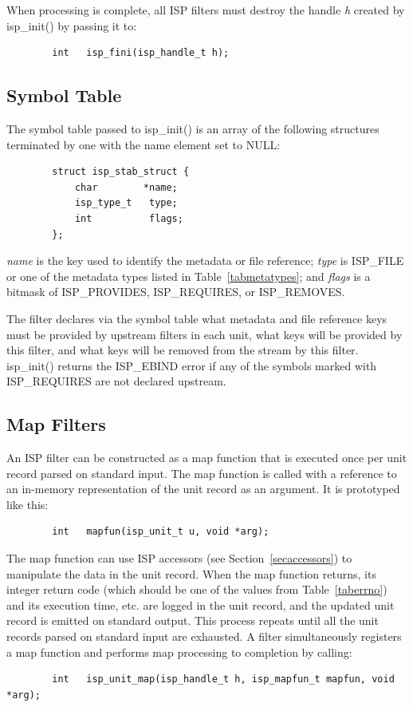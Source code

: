 \documentclass{article}
\begin{document}
When processing is complete, all ISP filters must destroy the handle {\em h}
created by isp\_init() by passing it to:
\begin{verbatim}
        int   isp_fini(isp_handle_t h);
\end{verbatim}

\subsection{Symbol Table}\label{secstab}

The symbol table passed to isp\_init() is an array of the
following structures terminated by one with the name element set to NULL:
\begin{verbatim}
        struct isp_stab_struct {
            char        *name;
            isp_type_t   type;
            int          flags;
        };
\end{verbatim}

{\em name} is the key used to identify the metadata or file reference;
{\em type} is ISP\_FILE or one of the metadata types listed in 
Table~\ref{tabmetatypes}; and 
{\em flags} is a bitmask of ISP\_PROVIDES, ISP\_REQUIRES, or ISP\_REMOVES.

The filter declares via the symbol table what metadata and file reference
keys must be provided by upstream filters in each unit, what keys will be 
provided by this filter, and what keys will be removed from the stream 
by this filter.  isp\_init() returns the ISP\_EBIND error if any of the 
symbols marked with ISP\_REQUIRES are not declared upstream.

\subsection{Map Filters}\label{secmap}

An ISP filter can be constructed as a map function that is executed once
per unit record parsed on standard input.
The map function is called with a reference to an in-memory representation 
of the unit record as an argument.  It is prototyped like this:
\begin{verbatim}
        int   mapfun(isp_unit_t u, void *arg);
\end{verbatim}
The map function can use ISP accessors (see Section~\ref{secaccessors}) 
to manipulate the data in the unit record.
When the map function returns, its integer return code 
(which should be one of the values from Table~\ref{taberrno})
and its execution time, etc. are logged in the unit record, 
and the updated unit record is emitted on standard output.  
This process repeats until all the unit records parsed on standard input 
are exhausted.  
A filter simultaneously registers a map function
and performs map processing to completion by calling:
\begin{verbatim}
        int   isp_unit_map(isp_handle_t h, isp_mapfun_t mapfun, void *arg);
\end{verbatim}
\end{document}
